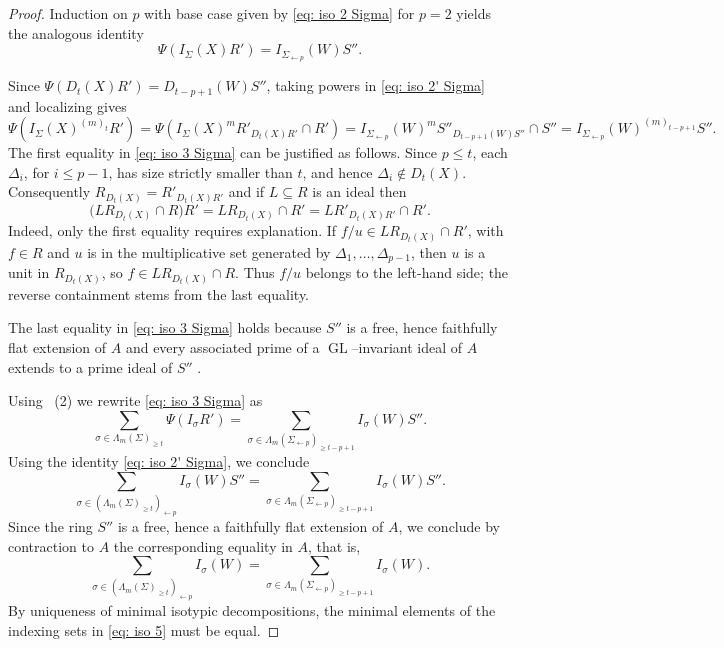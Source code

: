 \documentclass[11pt, reqno]{amsart}
\numberwithin{equation}{section}
\theoremstyle{definition}
\DeclareMathOperator{\GL}{GL}
\newcommand{\s}{\sigma}
\begin{document}
\begin{proof}
Induction on $p$ with base case given by \eqref{eq: iso 2 Sigma} for $p=2$ yields the analogous identity
\begin{equation}\label{eq: iso 2' Sigma}
\Psi(I_\Sigma(X)R')= I_{\Sigma_{\leftarrow p}}(W)S''.
\end{equation}

Since $\Psi(D_t(X)R')=D_{t-p+1}(W)S''$, taking powers in \eqref{eq: iso 2' Sigma} and localizing gives
\begin{equation}\label{eq: iso 3 Sigma}
\Psi(I_\Sigma(X)^{(m)_t}R') = \Psi(I_\Sigma(X)^m R'_{D_t(X)R'} \cap R')
=  I_{\Sigma_{\leftarrow p}}(W)^m S''_{D_{t-p+1}(W)S''} \cap S'' = I_{\Sigma_{\leftarrow p}}(W)^{(m)_{t-p+1}}S''.
\end{equation}
The first equality in \eqref{eq: iso 3 Sigma} can be justified as follows.
Since \(p\leq t\), each \(\Delta_i\), for \(i\leq p-1\), has size
strictly smaller than \(t\), and hence \(\Delta_i\notin D_t(X)\).
Consequently
$
R_{D_t(X)}= R'_{D_t(X)R'}
$
and if \(L\subseteq R\) is an ideal then
\[
\bigl(LR_{D_t(X)}\cap R\bigr)R'
=
LR_{D_t(X)}\cap R'
=
LR'_{D_t(X)R'}\cap R'.
\]
Indeed, only the first equality requires explanation. If
\(f/u\in LR_{D_t(X)}\cap R'\), with \(f\in R\) and \(u\) is in the multiplicative set generated by $\Delta_1, \ldots, \Delta_{p-1}$, then
\(u\) is a unit in \(R_{D_t(X)}\), so \(f\in LR_{D_t(X)}\cap R\).
Thus \(f/u\) belongs to the left-hand side; the reverse containment stems from the last equality.

The last equality in \eqref{eq: iso 3 Sigma} holds because $S''$ is a free, hence faithfully flat extension of $A$ and every associated prime of a $\GL$--invariant ideal of $A$ extends to a prime ideal of $S''$ \cite[Proposition 2.1]{Walker}.

Using ~(2)   we rewrite \eqref{eq: iso 3 Sigma}  as
\[
\sum_{\s\in \Lambda_m(\Sigma)_{\geq t}} \Psi(I_\s R')
=
\sum_{\s\in \Lambda_m(\Sigma_{\leftarrow p})_{\geq {t-p+1}}}I_\s(W) S''.
\]
Using the identity \eqref{eq: iso 2' Sigma}, we conclude
\begin{equation}\label{eq: iso 4}
\sum_{\s\in (\Lambda_m(\Sigma)_{\geq t})_{\leftarrow p}} I_\s(W) S''
=
\sum_{\s\in \Lambda_m(\Sigma_{\leftarrow p})_{\geq {t-p+1}}}I_\s(W) S''.
\end{equation}
Since the ring $S''$ is a free, hence a faithfully flat extension of $A$, we conclude by contraction to $A$ the corresponding equality in $A$, that is,
 \begin{equation}\label{eq: iso 5}
\sum_{\s\in (\Lambda_m(\Sigma)_{\geq t})_{\leftarrow p}} I_\s(W)
=
\sum_{\s\in \Lambda_m(\Sigma_{\leftarrow p})_{\geq {t-p+1}}}I_\s(W).
\end{equation}
By uniqueness of minimal isotypic decompositions, the minimal elements of the indexing sets in \eqref{eq: iso 5} must be equal.


\end{proof}
\end{document}

